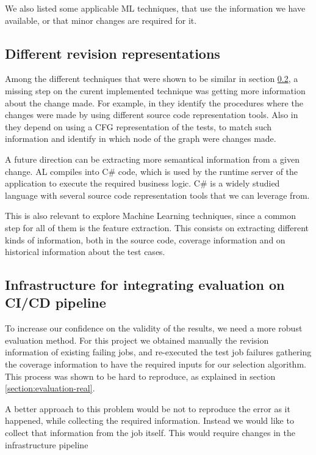\documentclass{article}
\begin{document}
We also listed some applicable ML techniques, that use the information we have available, or that minor changes are required for it.

\subsection{Different revision representations}
Among the different techniques that were shown to be similar in section \ref{}, a missing step on the curent implemented technique was getting more information about the change made. For example, in \cite{6405252} they identify the procedures where the changes were made by using different source code representation tools. Also in \cite{} they depend on using a CFG representation of the tests, to match such information and identify in which node of the graph were changes made.

A future direction can be extracting more semantical information from a given change. AL compiles into C\# code, which is used by the runtime server of the application to execute the required business logic. C\# is a widely studied language with several source code representation tools that we can leverage from.

This is also relevant to explore Machine Learning techniques, since a common step for all of them is the feature extraction. This consists on extracting different kinds of information, both in the source code, coverage information and on historical information about the test cases.

\subsection{Infrastructure for integrating evaluation on CI/CD pipeline}

To increase our confidence on the validity of the results, we need a more robust evaluation method. For this project we obtained manually the revision information of existing failing jobs, and re-executed the test job failures gathering the coverage information to have the required inputs for our selection algorithm. This process was shown to be hard to reproduce, as explained in section \ref{section:evaluation-real}.

A better approach to this problem would be not to reproduce the error as it happened, while collecting the required information. Instead we would like to collect that information from the job itself. This would require changes in the infrastructure pipeline
\end{document}
